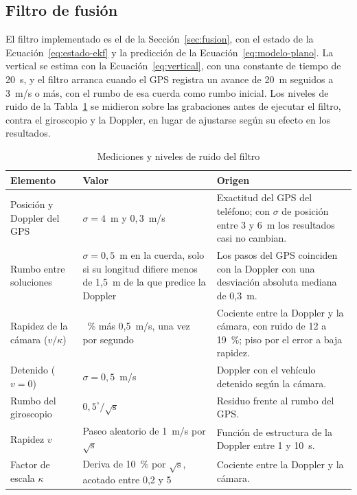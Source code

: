 \subsection{Filtro de fusión}
\label{sec:res-fusion}

El filtro implementado es el de la Sección~\ref{sec:fusion}, con el estado de la Ecuación~\eqref{eq:estado-ekf} y la predicción de la Ecuación~\eqref{eq:modelo-plano}.
La vertical se estima con la Ecuación~\eqref{eq:vertical}, con una constante de tiempo de 20~s, y el filtro arranca cuando el GPS registra un avance de 20~m seguidos a 3~m/s o más, con el rumbo de esa cuerda como rumbo inicial.
Los niveles de ruido de la Tabla~\ref{tab:res-ruidos} se midieron sobre las grabaciones antes de ejecutar el filtro, contra el giroscopio y la Doppler, en lugar de ajustarse según su efecto en los resultados.

\begin{table}[H]
\centering
\caption{Mediciones y niveles de ruido del filtro}
\label{tab:res-ruidos}
\small
\begin{tabularx}{\textwidth}{@{}>{\raggedright\arraybackslash}p{3.1cm}>{\raggedright\arraybackslash}p{4.6cm}>{\raggedright\arraybackslash}X@{}}
\toprule
\textbf{Elemento} & \textbf{Valor} & \textbf{Origen} \\
\midrule
Posición y Doppler del GPS & $\sigma = 4$~m y $0{,}3$~m/s & Exactitud del GPS del teléfono; con $\sigma$ de posición entre 3 y 6~m los resultados casi no cambian. \\
Rumbo entre soluciones & $\sigma = 0{,}5$~m en la cuerda, solo si su longitud difiere menos de 1,5~m de la que predice la Doppler & Los pasos del GPS coinciden con la Doppler con una desviación absoluta mediana de 0,3~m. \\
Rapidez de la cámara ($v/\kappa$) & 20~\% más 0,5~m/s, una vez por segundo & Cociente entre la Doppler y la cámara, con ruido de 12 a 19~\%; piso por el error a baja rapidez. \\
Detenido ($v = 0$) & $\sigma = 0{,}5$~m/s & Doppler con el vehículo detenido según la cámara. \\
Rumbo del giroscopio & $0{,}5^{\circ}/\sqrt{\mathrm{s}}$ & Residuo frente al rumbo del GPS. \\
Rapidez $v$ & Paseo aleatorio de 1~m/s por $\sqrt{\mathrm{s}}$ & Función de estructura de la Doppler entre 1 y 10~s. \\
Factor de escala $\kappa$ & Deriva de 10~\% por $\sqrt{\mathrm{s}}$, acotado entre 0,2 y 5 & Cociente entre la Doppler y la cámara. \\
\bottomrule
\end{tabularx}
\end{table}

